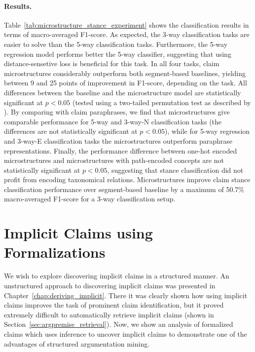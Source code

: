 \paragraph{Results. }
Table~\ref{tab:microstructure_stance_experiment} shows the classification
results in terms of macro-averaged F1-score.  As expected, the 3-way
classification tasks are easier to solve than the 5-way classification tasks.
Furthermore, the 5-way regression model performs better the 5-way classifier,
suggesting that using distance-sensetive loss is beneficial for this
task. In all four tasks, claim microstructures considerably outperform
both segment-based baselines, yielding between 9 and 25 points of
improvement in F1-score, depending on the task.
All differences between the baseline and the microstructure model 
are statistically significant at $p < 0.05$ (tested using
a two-tailed permutation test as described by \citet{yeh2000more}).
By comparing with claim paraphrases, we find that microstructures give
comparable performance for 5-way and 3-way-N classification tasks
(the differences are not statistically significant at $p < 0.05$),
while for 5-way regression and 3-way-E classification tasks
the microstructures outperform paraphrase representations. Finally, 
the performance difference between one-hot encoded microstructures
and microstructures with path-encoded concepts are not statistically
significant at $p < 0.05$, suggesting that stance classification did not
profit from encoding taxonomical relations. 
Microstructures improve claim stance classification performance over 
segment-based baseline by a maximum of 50.7\% macro-averaged F1-score
for a 3-way classification setup.

\section{Implicit Claims using Formalizations}
\label{sec:implicit_formalization}

We wish to explore discovering implicit claims in a structured manner. 
An unstructured approach to discovering implicit claims 
was presented in Chapter~\ref{chap:deriving_implicit}. There it was clearly
shown how using implicit claims improves the task of prominent 
claim identification, but it proved extremely difficult to automatically retrieve 
implicit claims (shown in Section~\ref{sec:argpremise_retrieval}). 
Now, we show an analysis of formalized claims which uses inference to uncover
implicit claims to demonstrate one of the advantages of structured
argumentation mining. 


